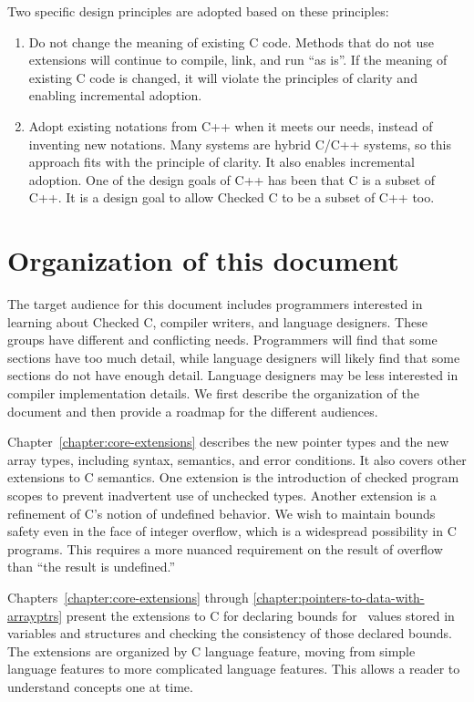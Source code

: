 Two specific design principles are adopted based on these principles:

\begin{enumerate}
\item
  Do not change the meaning of existing C code. Methods that do not use
  extensions will continue to compile, link, and run ``as is''. If the
  meaning of existing C code is changed, it will violate the principles
  of clarity and enabling incremental adoption.
\item
  Adopt existing notations from C++ when it meets our needs, instead of
  inventing new notations. Many systems are hybrid C/C++ systems, so
  this approach fits with the principle of clarity. It also enables
  incremental adoption. One of the design goals of C++ has been that C
  is a subset of C++.  It is a design goal to allow Checked C to be a 
  subset of C++ too.
\end{enumerate}

\section{Organization of this document}

The target audience for this document includes programmers interested in 
learning about Checked C, compiler writers, and language designers.
These groups have different and conflicting needs.  Programmers will find that
some sections have too much detail, while language designers will likely
find that some sections do not have enough detail.  Language designers
may be less interested in compiler implementation details.
We first describe the organization of the document and then provide
a roadmap for the different audiences.

Chapter~\ref{chapter:core-extensions} describes
the new pointer types and the new array types, including syntax,
semantics, and error conditions. It also covers other extensions to C
semantics. One extension is the introduction of checked program scopes to
prevent inadvertent use of unchecked types. Another extension is a
refinement of C's notion of undefined behavior. We wish to maintain
bounds safety even in the face of integer overflow, which is a
widespread possibility in C programs. This requires a more nuanced
requirement on the result of overflow than ``the result is undefined.''

Chapters~\ref{chapter:core-extensions} through 
\ref{chapter:pointers-to-data-with-arrayptrs}
present the extensions to C for declaring bounds
for \arrayptr\ values stored in variables and structures and
checking the consistency of those declared bounds. The extensions are
organized by C language feature, moving from simple language features to
more complicated language features. This allows a reader to understand
concepts one at time.

